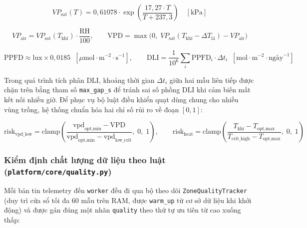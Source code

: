 \begin{equation}
VP_{\text{sat}}(T) = 0{,}61078 \cdot \exp\left(\frac{17{,}27 \cdot T}{T + 237{,}3}\right) \quad [\text{kPa}]
\end{equation}

\begin{equation}
VP_{\text{air}} = VP_{\text{sat}}(T_{\text{khí}}) \cdot \frac{\text{RH}}{100}, \qquad \text{VPD} = \max\Big(0,\; VP_{\text{sat}}(T_{\text{khí}} - \Delta T_{\text{lá}}) - VP_{\text{air}}\Big)
\end{equation}

\begin{equation}
\text{PPFD} \approx \text{lux} \times 0{,}0185 \;\; [\mu\text{mol}\cdot\text{m}^{-2}\cdot\text{s}^{-1}], \qquad \text{DLI} = \frac{1}{10^6}\sum_i \text{PPFD}_i \cdot \Delta t_i \;\; [\text{mol}\cdot\text{m}^{-2}\cdot\text{ngày}^{-1}]
\end{equation}

Trong quá trình tích phân DLI, khoảng thời gian \(\Delta t_i\) giữa hai mẫu liên tiếp được chặn trên bằng tham số \texttt{max\_gap\_s} để tránh sai số phồng DLI khi cảm biến mất kết nối nhiều giờ. Để phục vụ bộ luật điều khiển quạt dùng chung cho nhiều vùng trồng, hệ thống chuẩn hóa hai chỉ số rủi ro về đoạn \([0, 1]\):

\begin{equation}
\text{risk}_{\text{vpd\_low}} = \text{clamp}\left(\frac{\text{vpd}_{\text{opt,min}} - \text{VPD}}{\text{vpd}_{\text{opt,min}} - \text{vpd}_{\text{low\_crit}}},\; 0,\; 1\right), \qquad \text{risk}_{\text{heat}} = \text{clamp}\left(\frac{T_{\text{khí}} - T_{\text{opt,max}}}{T_{\text{crit\_high}} - T_{\text{opt,max}}},\; 0,\; 1\right)
\end{equation}

\subsubsection{Kiểm định chất lượng dữ liệu theo luật (\texttt{platform/core/quality.py})}

Mỗi bản tin telemetry đến \texttt{worker} đều đi qua bộ theo dõi \texttt{ZoneQualityTracker} (duy trì cửa sổ tối đa \(60\) mẫu trên RAM, được \texttt{warm\_up} từ cơ sở dữ liệu khi khởi động) và được gán đúng một nhãn \texttt{quality} theo thứ tự ưu tiên từ cao xuống thấp:


